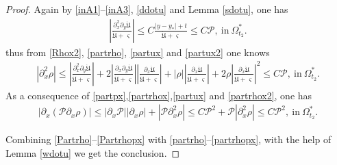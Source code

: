 \documentclass{amsart}
\numberwithin{equation}{section}
\begin{document}
\begin{proof}
Again by \eqref{inA1}--\eqref{inA3}, \eqref{ddotu} and Lemma \ref{sdotu}, one has
\begin{align*}
\left|\frac{\partial_{x}^{2}\partial_{y}\dot{\mathfrak{U}}}{\dot{\mathfrak{U}}+\varsigma}\right|
\leq C\frac{|y-y_{*}|+t}{\dot{\mathfrak{U}}+\varsigma}
\leq C\mathcal{P},~\text{in}~\Omega_{t_{2}}^{*}.
\end{align*}
thus from \eqref{Rhox2}, \eqref{partrho}, \eqref{partux} and \eqref{partux2} one knows
\begin{align}\label{partrhox2}
|\partial_{x}^{2}\rho|
\leq \left|\frac{\partial_{x}^{2}\partial_{y}\dot{\mathfrak{U}}}{\dot{\mathfrak{U}}+\varsigma}\right|
    +2\left|\frac{\partial_{x}\partial_{y}\dot{\mathfrak{U}}}{\dot{\mathfrak{U}}+\varsigma}\right|
      \left|\frac{\partial_{x}\dot{\mathfrak{U}}}{\dot{\mathfrak{U}}+\varsigma}\right|
    +|\rho|\left|\frac{\partial_{x}\dot{\mathfrak{U}}}{\dot{\mathfrak{U}}+\varsigma}\right|
    +2\rho\left|\frac{\partial_{x}\dot{\mathfrak{U}}}{\dot{\mathfrak{U}}+\varsigma}\right|^{2}
\leq C\mathcal{P},~\text{in}~\Omega_{t_{2}}^{*}.
\end{align}
As a consequence of \eqref{partpx},\eqref{partrhox},\eqref{partux} and \eqref{partrhox2}, one has
\begin{align}\label{partrhopx}
|\partial_{x}(\mathcal{P}\partial_{x}\rho)|
\leq |\partial_{x}\mathcal{P}||\partial_{x}\rho|+|\mathcal{P}\partial_{x}^{2}\rho|
\leq C\mathcal{P}^{2}+\mathcal{P}|\partial_{x}^{2}\rho|
\leq C\mathcal{P}^{2},~\text{in}~\Omega_{t_{2}}^{*}.
\end{align}

Combining \eqref{Partrho}--\eqref{Partrhopx} with \eqref{partrho}--\eqref{partrhopx}, with the help of Lemma \ref{wdotu} we get the conclusion.
\end{proof}
\end{document}
